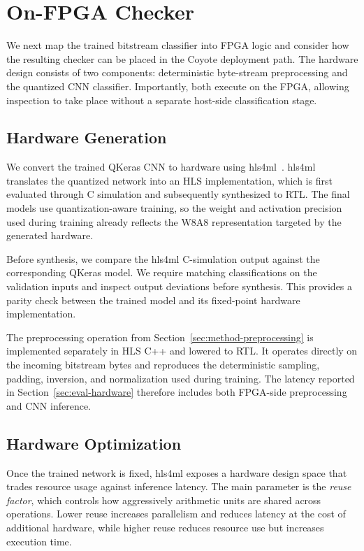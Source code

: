 \section{On-FPGA Checker}
\label{sec:on-fpga-checker}

We next map the trained bitstream classifier into FPGA logic and consider how
the resulting checker can be placed in the Coyote deployment path. The hardware
design consists of two components: deterministic byte-stream preprocessing and
the quantized CNN classifier. Importantly, both execute on the FPGA, allowing inspection to
take place without a separate host-side classification stage.

\subsection{Hardware Generation}
\label{sec:hardware-generation}

We convert the trained QKeras CNN to hardware using
hls4ml~\cite{duarte2018fast,aarrestad2021fast}. hls4ml translates the quantized
network into an HLS implementation, which is first evaluated through C
simulation and subsequently synthesized to RTL. The final models use
quantization-aware training, so the weight and activation precision used during
training already reflects the W8A8 representation targeted by the generated
hardware.

Before synthesis, we compare the hls4ml C-simulation output against the
corresponding QKeras model. We require matching classifications on the
validation inputs and inspect output deviations before synthesis. This provides
a parity check between the trained model and its fixed-point hardware
implementation.

The preprocessing operation from Section~\ref{sec:method-preprocessing} is
implemented separately in HLS C++ and lowered to RTL. It operates directly on
the incoming bitstream bytes and reproduces the deterministic sampling,
padding, inversion, and normalization used during training. The latency reported
in Section~\ref{sec:eval-hardware} therefore includes both FPGA-side
preprocessing and CNN inference.

\subsection{Hardware Optimization}
\label{sec:hardware-optimization}

Once the trained network is fixed, hls4ml exposes a hardware design space that
trades resource usage against inference latency. The main parameter is the
\emph{reuse factor}, which controls how aggressively arithmetic units are shared
across operations. Lower reuse increases parallelism and reduces latency at the
cost of additional hardware, while higher reuse reduces resource use but
increases execution time.

